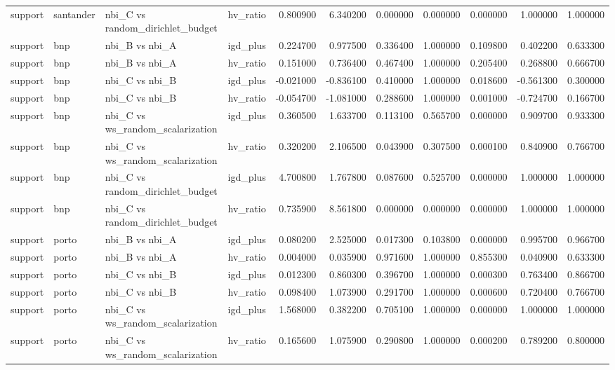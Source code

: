 \begin{landscape}
\begin{longtable}{llllrrrrrrr}
support & santander & nbi\_C vs random\_dirichlet\_budget & hv\_ratio & 0.800900 & 6.340200 & 0.000000 & 0.000000 & 0.000000 & 1.000000 & 1.000000 \\
support & bnp & nbi\_B vs nbi\_A & igd\_plus & 0.224700 & 0.977500 & 0.336400 & 1.000000 & 0.109800 & 0.402200 & 0.633300 \\
support & bnp & nbi\_B vs nbi\_A & hv\_ratio & 0.151000 & 0.736400 & 0.467400 & 1.000000 & 0.205400 & 0.268800 & 0.666700 \\
support & bnp & nbi\_C vs nbi\_B & igd\_plus & -0.021000 & -0.836100 & 0.410000 & 1.000000 & 0.018600 & -0.561300 & 0.300000 \\
support & bnp & nbi\_C vs nbi\_B & hv\_ratio & -0.054700 & -1.081000 & 0.288600 & 1.000000 & 0.001000 & -0.724700 & 0.166700 \\
support & bnp & nbi\_C vs ws\_random\_scalarization & igd\_plus & 0.360500 & 1.633700 & 0.113100 & 0.565700 & 0.000000 & 0.909700 & 0.933300 \\
support & bnp & nbi\_C vs ws\_random\_scalarization & hv\_ratio & 0.320200 & 2.106500 & 0.043900 & 0.307500 & 0.000100 & 0.840900 & 0.766700 \\
support & bnp & nbi\_C vs random\_dirichlet\_budget & igd\_plus & 4.700800 & 1.767800 & 0.087600 & 0.525700 & 0.000000 & 1.000000 & 1.000000 \\
support & bnp & nbi\_C vs random\_dirichlet\_budget & hv\_ratio & 0.735900 & 8.561800 & 0.000000 & 0.000000 & 0.000000 & 1.000000 & 1.000000 \\
support & porto & nbi\_B vs nbi\_A & igd\_plus & 0.080200 & 2.525000 & 0.017300 & 0.103800 & 0.000000 & 0.995700 & 0.966700 \\
support & porto & nbi\_B vs nbi\_A & hv\_ratio & 0.004000 & 0.035900 & 0.971600 & 1.000000 & 0.855300 & 0.040900 & 0.633300 \\
support & porto & nbi\_C vs nbi\_B & igd\_plus & 0.012300 & 0.860300 & 0.396700 & 1.000000 & 0.000300 & 0.763400 & 0.866700 \\
support & porto & nbi\_C vs nbi\_B & hv\_ratio & 0.098400 & 1.073900 & 0.291700 & 1.000000 & 0.000600 & 0.720400 & 0.766700 \\
support & porto & nbi\_C vs ws\_random\_scalarization & igd\_plus & 1.568000 & 0.382200 & 0.705100 & 1.000000 & 0.000000 & 1.000000 & 1.000000 \\
support & porto & nbi\_C vs ws\_random\_scalarization & hv\_ratio & 0.165600 & 1.075900 & 0.290800 & 1.000000 & 0.000200 & 0.789200 & 0.800000 \\

\end{longtable}
\end{landscape}
